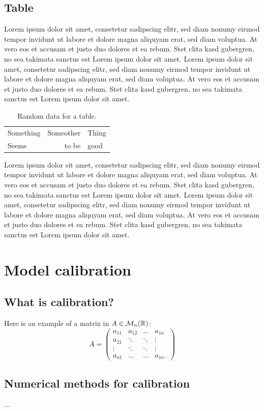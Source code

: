 \subsection{Table}
Lorem ipsum dolor sit amet, consetetur sadipscing elitr, sed diam nonumy eirmod tempor invidunt ut labore et dolore magna aliquyam erat, sed diam voluptua. At vero eos et accusam et justo duo dolores et ea rebum. Stet clita kasd gubergren, no sea takimata sanctus est Lorem ipsum dolor sit amet. Lorem ipsum dolor sit amet, consetetur sadipscing elitr, sed diam nonumy eirmod tempor invidunt ut labore et dolore magna aliquyam erat, sed diam voluptua. At vero eos et accusam et justo duo dolores et ea rebum. Stet clita kasd gubergren, no sea takimata sanctus est Lorem ipsum dolor sit amet.
\begin{table}[!ht]
	\centering
	\begin{tabular}{|l|rl|}
		\hline
		Something & Someother & Thing \\
  		Seems & to be & good\\
  		\hline
  	\end{tabular}
  	\caption{Random data for a table.}
\end{table}

Lorem ipsum dolor sit amet, consetetur sadipscing elitr, sed diam nonumy eirmod tempor invidunt ut labore et dolore magna aliquyam erat, sed diam voluptua. At vero eos et accusam et justo duo dolores et ea rebum. Stet clita kasd gubergren, no sea takimata sanctus est Lorem ipsum dolor sit amet. Lorem ipsum dolor sit amet, consetetur sadipscing elitr, sed diam nonumy eirmod tempor invidunt ut labore et dolore magna aliquyam erat, sed diam voluptua. At vero eos et accusam et justo duo dolores et ea rebum. Stet clita kasd gubergren, no sea takimata sanctus est Lorem ipsum dolor sit amet.


\section{Model calibration}
\subsection{What is calibration?}
Here is an example of a matrix\citep{website:fermentas-lambda} in $A\in\mathcal{M}_n(\mathbb{R})$:
$$
A = 
\begin{pmatrix}
a_{11} & a_{12} & \ldots & a_{1n}\\
a_{21} & \ddots & \ddots  & \vdots\\
\vdots &  \ddots & \ddots  & \vdots\\
a_{n1} &  \ldots &  \ldots & a_{1n}.
\end{pmatrix}
$$

\subsection{Numerical methods for calibration}
...


